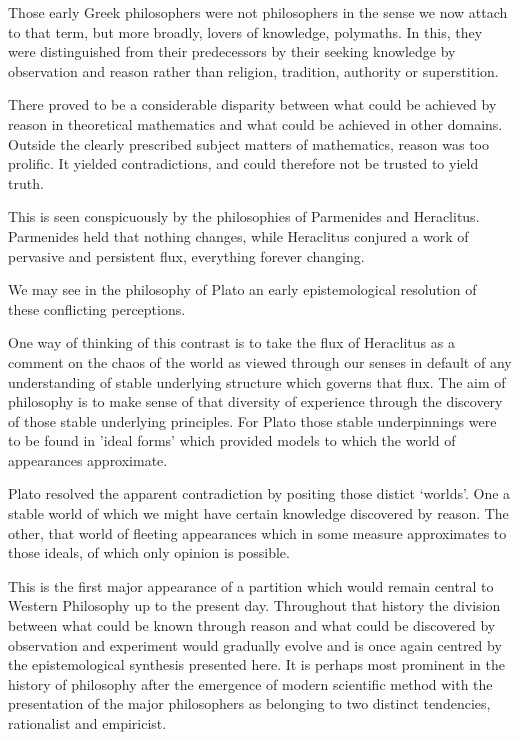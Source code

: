 \documentclass[10pt,titlepage]{book}
\begin{document}
Those early Greek philosophers were not philosophers in the sense we now attach to that term, but more broadly, lovers of knowledge, polymaths.
In this, they were distinguished from their predecessors by their seeking knowledge by observation and reason rather than religion, tradition, authority or superstition.

There proved to be a considerable disparity between what could be achieved by reason in theoretical mathematics and what could be achieved in other domains.
Outside the clearly prescribed subject matters of mathematics, reason was too prolific.
It yielded contradictions, and could therefore not be trusted to yield truth.

This is seen conspicuously by the philosophies of Parmenides and Heraclitus.
Parmenides held that nothing changes, while Heraclitus conjured a work of pervasive and persistent flux, everything forever changing.

We may see in the philosophy of Plato an early epistemological resolution of these conflicting perceptions.

One way of thinking of this contrast is to take the flux of Heraclitus as a comment on the chaos of the world as viewed through our senses in default of any understanding of stable underlying structure which governs that flux.
The aim of philosophy is to make sense of that diversity of experience through the discovery of those stable underlying principles.
For Plato those stable underpinnings were to be found in 'ideal forms' which provided models to which the world of appearances approximate.

Plato resolved the apparent contradiction by positing those distict `worlds'.
One a stable world of which we might have certain knowledge discovered by reason.
The other, that world of fleeting appearances which in some measure approximates to those ideals, of which only opinion is possible.

This is the first major appearance of a partition which would remain central to Western Philosophy up to the present day.
Throughout that history the division between what could be known through reason and what could be discovered by observation and experiment would gradually evolve and is once again centred by the epistemological synthesis presented here.
It is perhaps most prominent in the history of philosophy after the emergence of modern scientific method with the presentation of the major philosophers as belonging to two distinct tendencies, rationalist and empiricist.
\end{document}
